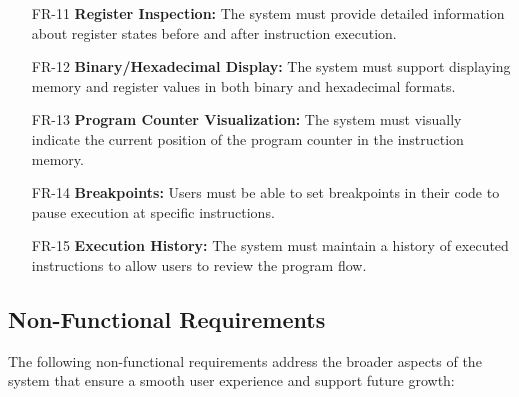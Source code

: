 \begin{enumerate}
    \item[FR-11] \textbf{Register Inspection:} The system must provide detailed information about register states before and after instruction execution.
    
    \item[FR-12] \textbf{Binary/Hexadecimal Display:} The system must support displaying memory and register values in both binary and hexadecimal formats.
    
    \item[FR-13] \textbf{Program Counter Visualization:} The system must visually indicate the current position of the program counter in the instruction memory.
    
    \item[FR-14] \textbf{Breakpoints:} Users must be able to set breakpoints in their code to pause execution at specific instructions.
    
    \item[FR-15] \textbf{Execution History:} The system must maintain a history of executed instructions to allow users to review the program flow.
\end{enumerate}

\subsection{Non-Functional Requirements}

The following non-functional requirements address the broader aspects of the system that ensure a smooth user experience and support future growth:

